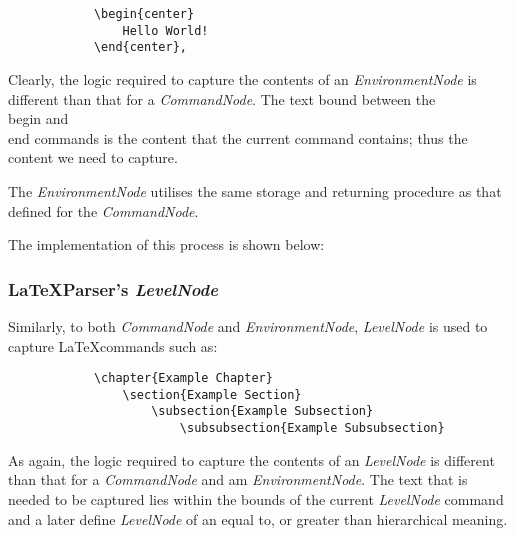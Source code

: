 {{\begin{verbatim}
			\begin{center}
				Hello World!
			\end{center},
		\end{verbatim}
		
		Clearly, the logic required to capture the contents of an \textit{EnvironmentNode} is different than that for a \textit{CommandNode}. The text bound between the \\begin and \\end commands is the content that the current command contains; thus the content we need to capture.
		
		The \textit{EnvironmentNode} utilises the same storage and returning procedure as that defined for the \textit{CommandNode}.
		
		The implementation of this process is shown below:
		
	\subsubsection*{\LaTeX Parser's \textit{LevelNode}}
		Similarly, to both \textit{CommandNode} and \textit{EnvironmentNode}, \textit{LevelNode} is used to capture \LaTeX commands such as:
		\begin{verbatim}
			\chapter{Example Chapter}
				\section{Example Section}
					\subsection{Example Subsection}
						\subsubsection{Example Subsubsection}
		\end{verbatim}
		
		As again, the logic required to capture the contents of an \textit{LevelNode} is different than that for a \textit{CommandNode} and am \textit{EnvironmentNode}. The text that is needed to be captured lies within the bounds of the current \textit{LevelNode} command and a later define \textit{LevelNode} of an equal to, or greater than hierarchical meaning.
		
}}
